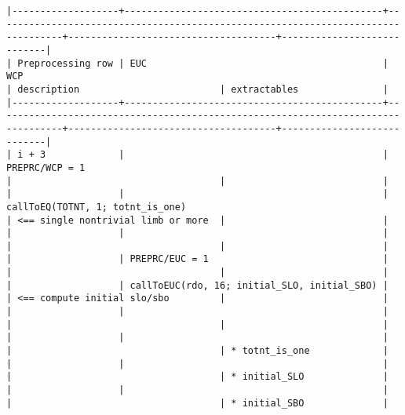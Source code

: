 \documentclass[varwidth=\maxdimen,margin=0.5cm,multi={verbatim}]{standalone}
\begin{document}
\begin{verbatim}
|-------------------+----------------------------------------------+----------------------------------------------------------------------------------+-------------------------------------+----------------------------|
| Preprocessing row | EUC                                          | WCP                                                                              | description                         | extractables               |
|-------------------+----------------------------------------------+----------------------------------------------------------------------------------+-------------------------------------+----------------------------|
| i + 3             |                                              | PREPRC/WCP = 1                                                                   |                                     |                            |
|                   |                                              | callToEQ(TOTNT, 1; totnt_is_one)                                                 | <== single nontrivial limb or more  |                            |
|                   |                                              |                                                                                  |                                     |                            |
|                   | PREPRC/EUC = 1                               |                                                                                  |                                     |                            |
|                   | callToEUC(rdo, 16; initial_SLO, initial_SBO) |                                                                                  | <== compute initial slo/sbo         |                            |
|                   |                                              |                                                                                  |                                     |                            |
|                   |                                              |                                                                                  |                                     | * totnt_is_one             |
|                   |                                              |                                                                                  |                                     | * initial_SLO              |
|                   |                                              |                                                                                  |                                     | * initial_SBO              |

\end{verbatim}
\end{document}

